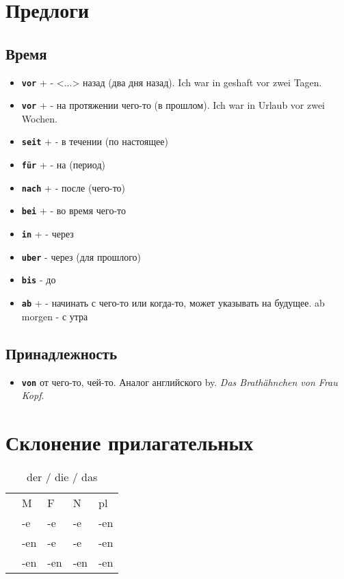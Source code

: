\documentclass[12pt,a4paper]{report}
\newcommand{\term}[1]{\texttt{\textbf{#1}}}
\newcommand{\ubersatze}[1]{\textit{#1}}
\newcommand{\nom}{ {\color{black}{\textbf{N}}} }
\newcommand{\akk}{ {\color{red}{\textbf{A}}} }
\newcommand{\dat}{ {\color{blue}{\textbf{D}}} }
\begin{document}
\chapter{Предлоги}
\section{Время}
\begin{itemize}
 \item \term{vor} + \dat - <...> назад (два дня назад). Ich war in geshaft vor zwei Tagen.
 \item \term{vor} + \dat - на протяжении чего-то (в прошлом). Ich war in Urlaub vor zwei Wochen.
 \item \term{seit} + \dat - в течении (по настоящее)
 \item \term{für} + \akk - на (период)
 \item \term{nach} + \dat - после (чего-то)
 \item \term{bei} + \dat - во время чего-то
 \item \term{in} + \dat - через
 \item \term{uber} - через (для прошлого)
 \item \term{bis} - до
 \item \term{ab} + \dat - начинать с чего-то или когда-то, может указывать на будущее. ab morgen - с утра
\end{itemize}

\section{Принадлежность}
\begin{itemize}
\item \term{von} от чего-то, чей-то. Аналог английского by. \ubersatze{Das Brathähnchen von Frau Kopf}.
\end{itemize}

\chapter{Склонение прилагательных}

\begin{longtable}{ c l l l l }
\caption{der / die / das} \label{tab:long} \\
		& M 	& F 	& N 	& pl 	\\
\nom 	& -e 	& -e	&	-e	& -en	\\
\akk 	& -en 	& -e	&	-e	& -en	\\
\dat 	& -en 	& -en	&	-en	& -en	\\
\end{longtable}
\end{document}
